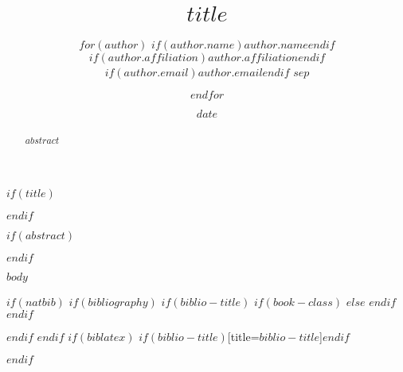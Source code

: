 \documentclass[11pt]{article}
\title{$title$}
\author{$for(author)$
           $if(author.name)$$author.name$$endif$ \\
           $if(author.affiliation)$$author.affiliation$$endif$ \\
           $if(author.email)${\tt $author.email$}$endif$
           $sep$ \and
        $endfor$}
\date{$date$}
\begin{document}
$if(title)$\maketitle$endif$

$if(abstract)$
\begin{abstract}
    $abstract$
\end{abstract}
$endif$

$body$

$if(natbib)$
$if(bibliography)$
$if(biblio-title)$
$if(book-class)$
\renewcommand\bibname{$biblio-title$}
$else$
\renewcommand\refname{$biblio-title$}
$endif$
$endif$



$endif$
$endif$
$if(biblatex)$
\printbibliography$if(biblio-title)$[title=$biblio-title$]$endif$

$endif$
\end{document}
